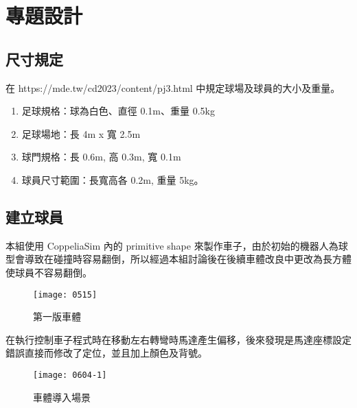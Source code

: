 \chapter{專題設計}
\renewcommand{\baselinestretch}{10.0} %
\setcounter{page}{1}  %
\fontsize{14pt}{2.5pt}\sectionef

\section{尺寸規定}
在 https://mde.tw/cd2023/content/pj3.html 中規定球場及球員的大小及重量。\\
\begin{enumerate}
\item 足球規格：球為白色、直徑 0.1m、重量 0.5kg\\
\item 足球場地：長 4m x 寬 2.5m\\
\item 球門規格：長 0.6m, 高 0.3m, 寬 0.1m\\
\item 球員尺寸範圍：長寬高各 0.2m, 重量 5kg。\\
\end{enumerate}
\renewcommand{\baselinestretch}{0.5} %

\section{建立球員}
本組使用 CoppeliaSim 內的 primitive shape 來製作車子，由於初始的機器人為球型會導致在碰撞時容易翻倒，所以經過本組討論後在後續車體改良中更改為長方體使球員不容易翻倒。\\
\begin{figure}[hbt!]
\begin{center}
\texttt{[image: 0515]}
\caption{\Large 第一版車體}\label{車體}
\end{center}
\end{figure}
在執行控制車子程式時在移動左右轉彎時馬達產生偏移，後來發現是馬達座標設定錯誤直接而修改了定位，並且加上顏色及背號。
\begin{figure}[hbt!]
\begin{center}
\texttt{[image: 0604-1]}
\caption{\Large 車體導入場景}\label{車體導入場景}
\end{center}
\end{figure}

